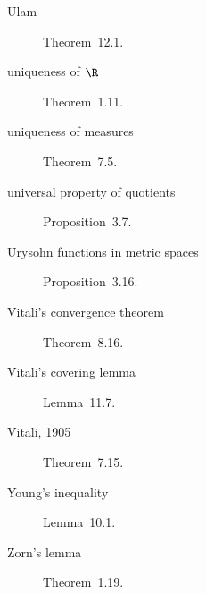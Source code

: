 \begin{description}
\item[Ulam] Theorem~12.1.
\item[uniqueness of $\R$] Theorem~1.11.
\item[uniqueness of measures] Theorem~7.5.
\item[universal property of quotients] Proposition~3.7.
\item[Urysohn functions in metric spaces] Proposition~3.16.
\item[Vitali's convergence theorem] Theorem~8.16.
\item[Vitali's covering lemma] Lemma~11.7.
\item[Vitali, 1905] Theorem~7.15.
\item[Young's inequality] Lemma~10.1.
\item[Zorn's lemma] Theorem~1.19.
\end{description}
